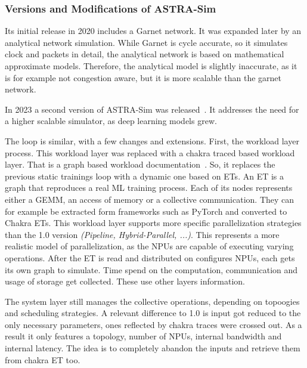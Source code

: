\subsubsection*{Versions and Modifications of ASTRA-Sim}
\label{sec:comparison}
Its initial release in 2020 includes a Garnet network. It was expanded later by an analytical network simulation. While Garnet is cycle accurate, so it simulates clock and packets in detail, the analytical network is based on mathematical approximate models. Therefore, the analytical model is slightly inaccurate, as it is for example not congestion aware, but it is more scalable than the garnet network.

In 2023 a second version of \ac{ASTRA-Sim} was released~\cite{won_astra-sim20_2023}. It addresses the need for a higher scalable simulator, as deep learning models grew. %

The loop is similar, with a few changes and extensions.
First, the workload layer process. This workload layer was replaced with a chakra traced based workload layer. That is a graph based workload documentation~\cite{sridharan_chakra_2023}.
So, it replaces the previous static trainings loop with a dynamic one based on \acp{ET}. An \ac{ET} is a graph that reproduces a real \ac{ML} training process. Each of its nodes represents either a \ac{GEMM}, an access of memory or a collective communication. They can for example be extracted form frameworks such as PyTorch and converted to Chakra \acp{ET}.
This workload layer supports more specific parallelization strategies than the 1.0 version \textit{(Pipeline, Hybrid-Parallel, ...)}. %
This represents a more realistic model of parallelization, as the \acp{NPU} are capable of executing varying operations. 
After the \ac{ET} is read and distributed on configures \acp{NPU}, each gets its own graph to simulate. Time spend on the computation, communication and usage of storage get collected. These use other layers information.

The system layer still manages the collective operations, depending on topoogies and scheduling strategies. A relevant difference to 1.0 is input got reduced to the only necessary parameters, ones reflected by chakra traces were crossed out. As a result it only features a topology, number of \acp{NPU}, internal bandwidth and internal latency. %
The idea is to completely abandon the inputs and retrieve them from chakra \ac{ET} too.

